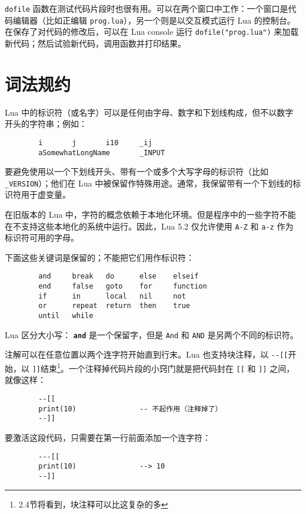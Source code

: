 \verb|dofile| 函数在测试代码片段时也很有用。可以在两个窗口中工作：一个窗口是代码编辑器（比如正编辑 \verb|prog.lua|），另一个则是以交互模式运行 Lua 的控制台。在保存了对代码的修改后，可以在 Lua console 运行 \verb|dofile("prog.lua")| 来加载新代码；然后试验新代码，调用函数并打印结果。

\section{词法规约}

Lua 中的标识符（或名字）可以是任何由字母、数字和下划线构成，但不以数字开头的字符串；例如：

\begin{verbatim}
        i       j       i10     _ij
        aSomewhatLongName       _INPUT
\end{verbatim}

要避免使用以一个下划线开头、带有一个或多个大写字母的标识符（比如 \verb|_VERSION|）；他们在 Lua 中被保留作特殊用途。通常，我保留带有一个下划线的标识符用于虚变量。

在旧版本的 Lua 中，字符的概念依赖于本地化环境。但是程序中的一些字符不能在不支持这些本地化的系统中运行。因此，Lua 5.2 仅允许使用 \verb|A-Z| 和 \verb|a-z| 作为标识符可用的字母。

下面这些关键词是保留的；不能把它们用作标识符：

\begin{verbatim}
        and     break   do      else    elseif
        end     false   goto    for     function
        if      in      local   nil     not
        or      repeat  return  then    true
        until   while
\end{verbatim}

Lua 区分大小写： {\bfseries \verb|and|} 是一个保留字，但是 \verb|And| 和 \verb|AND| 是另两个不同的标识符。

注解可以在任意位置以两个连字符开始直到行末。Lua 也支持块注释，以 \verb|--[[|开始，以 \verb|]]|结束\footnote{2.4节将看到，块注释可以比这复杂的多}。一个注释掉代码片段的小窍门就是把代码封在 \verb|[[| 和 \verb|]]| 之间，就像这样：

\begin{verbatim}
        --[[
        print(10)               -- 不起作用（注释掉了）
        --]]
\end{verbatim}

要激活这段代码，只需要在第一行前面添加一个连字符：

\begin{verbatim}
        ---[[
        print(10)               --> 10
        --]]
\end{verbatim}

